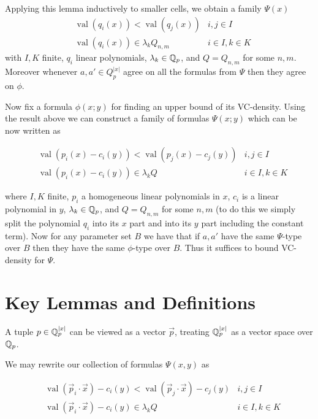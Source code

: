 \documentclass{amsart}
\newcommand{\paren}[1]{\left(#1\right)}
\DeclareMathOperator{\val}{val}
\begin{document}
Applying this lemma inductively to smaller cells, we obtain a family $\Psi(x)$
\begin{align*}
		&\val \paren{q_i(x)} < \val \paren{q_j(x)} & i, j \in I \\
		&\val \paren{q_i(x)} \in \lambda_k Q_{n,m} & i \in I , k \in K
\end{align*}
with $I, K$ finite,
$q_i$ linear polynomials,
$\lambda_k \in \mathbb{Q}_p$, and
$Q = Q_{n,m}$ for some $n,m$.
Moreover whenever $a, a' \in Q_p^{|x|}$ agree on all the formulas from $\Psi$ then they agree on $\phi$.

Now fix a formula $\phi(x; y)$ for finding an upper bound of its VC-density.
Using the result above we can construct a family of formulas $\Psi(x; y)$ which can be now written as

\begin{align*}
	&\val (p_i(x) - c_i(y)) < \val (p_j(x) - c_j(y)) & i, j \in I \\
	&\val (p_i(x) - c_i(y)) \in \lambda_k Q & i \in I , k \in K
\end{align*}

where $I, K$ finite,
$p_i$ a homogeneous linear polynomials in $x$,
$c_i$ is a linear polynomial in $y$,
$\lambda_k \in \mathbb{Q}_p$, and
$Q = Q_{n,m}$ for some $n,m$
(to do this we simply split the polynomial $q_i$ into its $x$ part and into its $y$ part including the constant term).
Now for any parameter set $B$ we have that if $a, a'$ have the same $\Psi$-type over $B$ then they have the same $\phi$-type over $B$.
Thus it suffices to bound VC-density for $\Psi$.


\section{Key Lemmas and Definitions}

\begin{Definition}
	A tuple $p \in  \mathbb{Q}_p^{|x|}$ can be viewed as a vector $\vec p$, treating $\mathbb{Q}_p^{|x|}$ as a vector space over $\mathbb{Q}_p$.
\end{Definition}

We may rewrite our collection of formulas $\Psi(x, y)$ as

\begin{align*}
	&\val (\vec p_i \cdot \vec x) - c_i(y) < \val (\vec p_j \cdot \vec x) - c_j(y) & i, j \in I \\
	&\val (\vec p_i \cdot \vec x) - c_i(y) \in \lambda_k Q & i \in I , k \in K
\end{align*}
\end{document}

